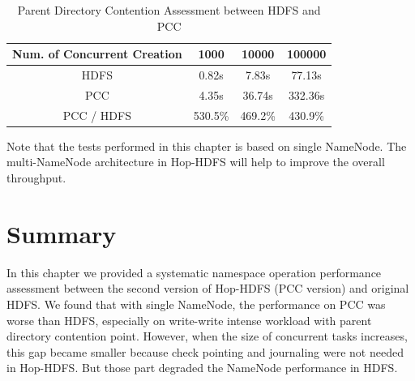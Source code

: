 \begin{table}[h]
	\centering
	\begin{tabular}{|c|c|c|c|}
		\hline
		\textbf{Num. of Concurrent Creation} & \textbf{1000} & \textbf{10000} & \textbf{100000} \\ \hline
		HDFS                                 & 0.82s         & 7.83s          & 77.13s          \\ \hline
		PCC                       & 4.35s         & 36.74s         & 332.36s         \\ \hline
		PCC / HDFS                           & 530.5\%       & 469.2\%        & 430.9\%         \\ \hline
	\end{tabular}
		\caption{Parent Directory Contention Assessment between HDFS and PCC}
		\label{table:hdfsPCCparent}
\end{table}

\noindent Note that the tests performed in this chapter is based on single NameNode. The multi-NameNode architecture in Hop-HDFS will help to improve the overall throughput.

\section*{Summary}
In this chapter we provided a systematic namespace operation performance assessment between the second version of Hop-HDFS (PCC version) and original HDFS. We found that with single NameNode, the performance on PCC was worse than HDFS, especially on write-write intense workload with parent directory contention point. However, when the size of concurrent tasks increases, this gap became smaller because check pointing and journaling were not needed in Hop-HDFS. But those part degraded the NameNode performance in HDFS.